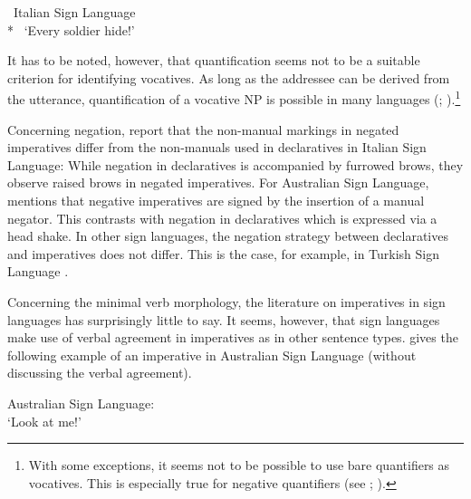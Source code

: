 \begin{exe}
\ex \textcolor{white}{*}Italian Sign Language \\ *
\glt \textcolor{white}{*}`Every soldier hide!' \label{imperativesubjectslisb}
\end{exe}

\noindent It has to be noted, however, that quantification seems not to be a suitable criterion for identifying vocatives. As long as the addressee can be derived from the utterance, quantification of a vocative NP is possible in many languages (\citealt[194--197]{potsdam1996syntactic}; \citealt[815--816]{croitor2013constituents}).\footnote{ With some exceptions, it seems not to be possible to use bare quantifiers as vocatives. This is especially true for negative quantifiers (see \citealt[414--415]{portner2007structions}; \citealt[58--59]{hill2013vocatives}).}

Concerning negation, \citet{donati2017searching} report that the non-manual markings in negated imperatives differ from the non-manuals used in declaratives in Italian Sign Language: While negation in declaratives is accompanied by furrowed brows, they observe raised brows in negated imperatives. For Australian Sign Language, \citet[v196--197]{johnston1989auslan} mentions that negative imperatives are signed by the insertion of a manual negator. This contrasts with negation in declaratives which is expressed via a head shake. In other sign languages, the negation strategy between declaratives and imperatives does not differ. This is the case, for example, in Turkish Sign Language \citep{ozsoy2014commands}. %

Concerning the minimal verb morphology, the literature on imperatives in sign languages has surprisingly little to say. It seems, however, that sign languages make use of verbal agreement in imperatives as in other sentence types.  \citet[195]{johnston1989auslan} gives the following example of an imperative in Australian Sign Language (without discussing the verbal agreement).


\begin{exe}
\ex Australian Sign Language: \\ 
\glt `Look at me!' \label{imperativeauslan}
\end{exe}

